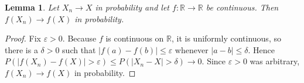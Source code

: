 \documentclass{article}
\newtheorem{lemma}{Lemma}
\begin{document}
\begin{lemma}\label{lem:continuous-mapping}
Let $X_n \to X$ in probability and let $f : \mathbb{R} \to \mathbb{R}$ be
continuous. Then $f(X_n) \to f(X)$ in probability.
\end{lemma}

\begin{proof}
Fix $\varepsilon > 0$.
Because $f$ is continuous on $\mathbb{R}$, it is uniformly continuous, so
there is a $\delta > 0$ such that $|f(a) - f(b)| \le \varepsilon$ whenever
$|a - b| \le \delta$.
Hence $P(|f(X_n) - f(X)| > \varepsilon) \le P(|X_n - X| > \delta) \to 0$.
Since $\varepsilon > 0$ was arbitrary, $f(X_n) \to f(X)$ in probability.
\end{proof}
\end{document}
